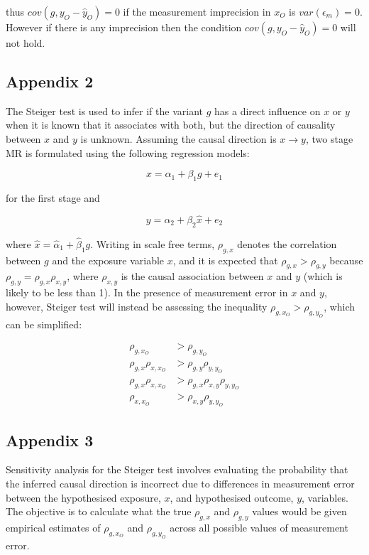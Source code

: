 \documentclass[]{article}
\begin{document}
thus \(cov(g, y_O - \hat{y}_O) = 0\) if the measurement imprecision in
\(x_O\) is \(var(\epsilon_m) = 0\). However if there is any imprecision
then the condition \(cov(g, y_O - \hat{y}_O) = 0\) will not hold.

\newpage

\subsection{Appendix 2}\label{appendix-2}

The Steiger test is used to infer if the variant \(g\) has a direct
influence on \(x\) or \(y\) when it is known that it associates with
both, but the direction of causality between \(x\) and \(y\) is unknown.
Assuming the causal direction is \(x \to y\), two stage MR is formulated
using the following regression models:

\[
x = \alpha_1 + \beta_1 g + e_1
\]

for the first stage and

\[
y = \alpha_2 + \beta_2 \hat{x} + e_2
\]

where \(\hat{x} = \hat{\alpha}_1 + \hat{\beta}_1 g\). Writing in scale
free terms, \(\rho_{g, x}\) denotes the correlation between \(g\) and
the exposure variable \(x\), and it is expected that
\(\rho_{g, x} > \rho_{g, y}\) because
\(\rho_{g, y} = \rho_{g, x}\rho_{x, y}\), where \(\rho_{x, y}\) is the
causal association between \(x\) and \(y\) (which is likely to be less
than 1). In the presence of measurement error in \(x\) and \(y\),
however, Steiger test will instead be assessing the inequality
\(\rho_{g, x_O} > \rho_{g, y_O}\), which can be simplified:

\[
\begin{aligned}
\rho_{g, x_O} & > \rho_{g, y_O} \\
\rho_{g, x} \rho_{x, x_O} & > \rho_{g,y}\rho_{y,y_O}\\
\rho_{g, x} \rho_{x, x_O} & > \rho_{g,x}\rho_{x,y}\rho_{y,y_O}\\
\rho_{x, x_O} & > \rho_{x,y}\rho_{y,y_O}
\end{aligned}
\]

\newpage

\subsection{Appendix 3}\label{appendix-3}

Sensitivity analysis for the Steiger test involves evaluating the
probability that the inferred causal direction is incorrect due to
differences in measurement error between the hypothesised exposure,
\(x\), and hypothesised outcome, \(y\), variables. The objective is to
calculate what the true \(\rho_{g, x}\) and \(\rho_{g, y}\) values would
be given empirical estimates of \(\rho_{g, x_O}\) and \(\rho_{g, y_O}\)
across all possible values of measurement error.
\end{document}
